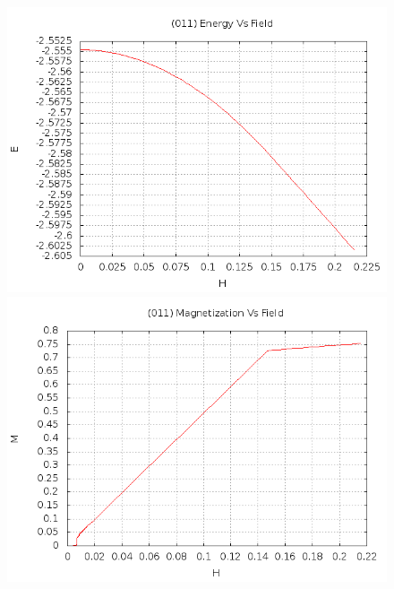 \begin{figure}[ht]
\centering
\includegraphics[scale=0.3]{25june16/HVariedData/Increasing/011Einc.png}
\includegraphics[scale=0.3]{25june16/HVariedData/Increasing/011Minc.png}
\end{figure}
